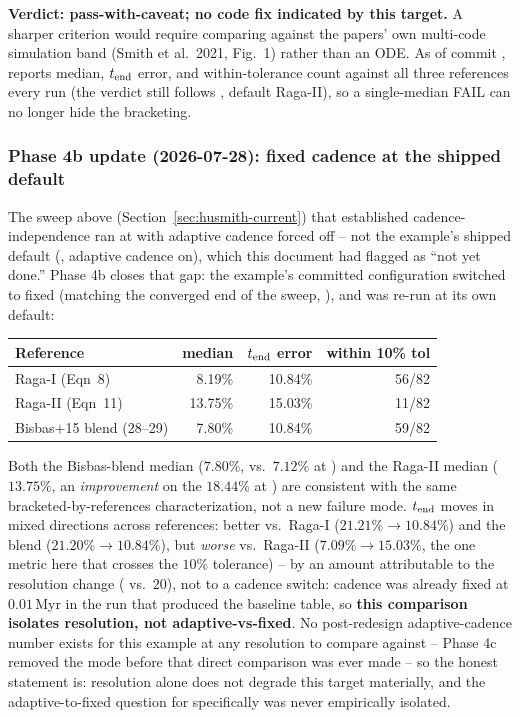 \textbf{Verdict: pass-with-caveat; no code fix indicated by this
target.} A sharper criterion would require comparing against the
papers' own multi-code simulation band (Smith et al.\ 2021, Fig.~1)
rather than an ODE. As of commit ,
 reports median, $t_{\rm end}$
error, and within-tolerance count against all three references every
run (the verdict still follows , default Raga-II),
so a single-median FAIL can no longer hide the bracketing.

\subsubsection{Phase 4b update (2026-07-28): fixed cadence at the shipped default}
\label{sec:husmith-4b}

The sweep above (Section~\ref{sec:husmith-current}) that established
cadence-independence ran at  with adaptive cadence
forced off -- not the example's shipped default
(, adaptive cadence on), which this document had
flagged as ``not yet done.'' Phase 4b closes that gap: the example's
committed configuration switched to fixed
 (matching the converged end of the
sweep, ), and was re-run at
its own  default:

\begin{center}
\begin{tabular}{lrrr}
\hline
Reference & median & $t_{\rm end}$ error & within 10\% tol \\
\hline
Raga-I (Eqn~8)          &  8.19\% & 10.84\% & 56/82 \\
Raga-II (Eqn~11)        & 13.75\% & 15.03\% & 11/82 \\
Bisbas+15 blend (28--29) &  7.80\% & 10.84\% & 59/82 \\
\hline
\end{tabular}
\end{center}

Both the Bisbas-blend median ($7.80\%$, vs.\ $7.12\%$ at
) and the Raga-II median ($13.75\%$, an
\emph{improvement} on the $18.44\%$ at ) are
consistent with the same bracketed-by-references characterization,
not a new failure mode. $t_{\rm end}$ moves in mixed directions across
references: better vs.\ Raga-I ($21.21\%\to10.84\%$) and the blend
($21.20\%\to10.84\%$), but \emph{worse} vs.\ Raga-II
($7.09\%\to15.03\%$, the one metric here that crosses the $10\%$
tolerance) -- by an amount attributable to the resolution change
( vs.\ $20$), not to a cadence switch: cadence was
already fixed at $0.01\,$Myr in the run that produced the baseline
table, so \textbf{this comparison isolates resolution, not
adaptive-vs-fixed}. No post-redesign adaptive-cadence number exists
for this example at any resolution to compare against -- Phase 4c
removed the mode before that direct comparison was ever made -- so the
honest statement is: resolution alone does not degrade this target
materially, and the adaptive-to-fixed question for
 specifically was never empirically
isolated.

